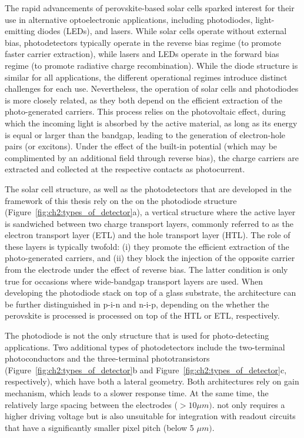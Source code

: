 The rapid advancements of perovskite-based solar cells sparked interest for their use in alternative optoelectronic applications, including photodiodes, light-emitting diodes (LEDs), and lasers. While solar cells operate without external bias, photodetectors typically operate in the reverse bias regime (to promote faster carrier extraction), while lasers and LEDs operate in the forward bias regime (to promote radiative charge recombination). While the diode structure is similar for all applications, the different operational regimes introduce distinct challenges for each use. Nevertheless, the operation of solar cells and photodiodes is more closely related, as they both depend on the efficient extraction of the photo-generated carriers. This process relies on the photovoltaic effect, during which the incoming light is absorbed by the active material, as long as its energy is equal or larger than the bandgap, leading to the generation of electron-hole pairs (or excitons). Under the effect of the built-in potential (which may be complimented by an additional field through reverse bias), the charge carriers are extracted and collected at the respective contacts as photocurrent. 

The solar cell structure, as well as the photodetectors that are developed in the framework of this thesis rely on the on the photodiode structure (Figure~\ref{fig:ch2:types_of_detector}a), a vertical structure where the active layer is sandwiched between two charge transport layers, commonly referred to as the electron transport layer (ETL) and the hole transport layer (HTL). The role of these layers is typically twofold: (i) they promote the efficient extraction of the photo-generated carriers, and (ii) they block the injection of the opposite carrier from the electrode under the effect of reverse bias. The latter condition is only true for occasions where wide-bandgap transport layers are used. When developing the photodiode stack on top of a glass substrate, the architecture can be further distinguished in p-i-n and n-i-p, depending on the whether the perovskite is processed is processed on top of the HTL or ETL, respectively. 

The photodiode is not the only structure that is used for photo-detecting applications. Two additional types of photodetectors include the two-terminal photoconductors and the three-terminal phototransistors (Figure~\ref{fig:ch2:types_of_detector}b and Figure~\ref{fig:ch2:types_of_detector}c, respectively), which have both a lateral geometry. Both architectures rely on gain mechanism, which leads to a slower response time. At the same time, the relatively large spacing between the electrodes ($> 10 \mu m)$. not only requires a higher driving voltage but is also unsuitable for integration with readout circuits that have a significantly smaller pixel pitch (below 5 $\mu m)$.

